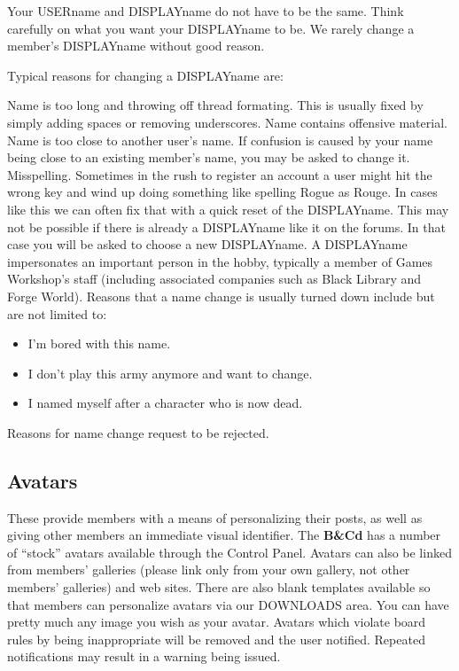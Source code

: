 \documentclass[12pt]{article}
\newcommand{\BnC}{{\textbf{B\&Cd}}}%
\begin{document}
Your USERname and DISPLAYname do not have to be the same. Think 
carefully on what you want your DISPLAYname to be. We rarely change a 
member's DISPLAYname without good reason.

Typical reasons for changing a DISPLAYname are:

Name is too long and throwing off thread formating. This is usually 
fixed by simply adding spaces or removing underscores.
Name contains offensive material.
Name is too close to another user's name. If confusion is caused by 
your name being close to an existing member's name, you may be asked to 
change it.
Misspelling. Sometimes in the rush to register an account a user might 
hit the wrong key and wind up doing something like spelling Rogue as 
Rouge. In cases like this we can often fix that with a quick reset of 
the DISPLAYname. This may not be possible if there is already a 
DISPLAYname like it on the forums. In that case you will be asked to 
choose a new DISPLAYname.
A DISPLAYname impersonates an important person in the hobby, typically 
a member of Games Workshop's staff (including associated companies such 
as Black Library and Forge World).
Reasons that a name change is usually turned down include but are not 
limited to:

\begin{table}[H]
\begin{itemize}
\item I'm bored with this name.
\item I don't play this army anymore and want to change.
\item I named myself after a character who is now dead.
\end{itemize}
	\caption{Reasons for name change request to be rejected.}
\end{table}

\subsection{Avatars}

These provide members with a means of personalizing their posts, as 
well as giving other members an immediate visual identifier. The
{\BnC} has a number of ``stock'' avatars available through the 
Control Panel. Avatars can also be linked from members' galleries 
(please link only from your own gallery, not other members' galleries) 
and web sites. There are also blank templates available so that members 
can personalize avatars via our DOWNLOADS area. You can have pretty 
much any image you wish as your avatar. Avatars which violate board 
rules by being inappropriate will be removed and the user notified. 
Repeated notifications may result in a warning being issued.
\end{document}
